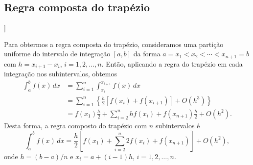 \subsection{Regra composta do trapézio}

\begin{flushleft}
  [[tag:revisar]]
\end{flushleft}

Para obtermos a regra composta do trapézio, consideramos uma partição uniforme do intervalo de integração $[a, b]$ da forma $a=x_1 < x_2 < \cdots < x_{n+1}=b$ com $h=x_{i+1}-x_{i}$, $i=1, 2, \dotsc, n$. Então, aplicando a regra do trapézio em cada integração nos subintervalos, obtemos
\begin{align}
  \int_a^bf(x)\,dx &= \sum_{i=1}^n \int_{x_i}^{x_{i+1}} f(x)\,dx\\
  &= \sum_{i=1}^n \left\{\frac{h}{2}\left[f(x_i)+f(x_{i+1})\right] + O(h^3)\right\}\\
  &= f(x_1)\frac{h}{2} + \sum_{i=2}^{n} hf(x_i) + f(x_{n+1})\frac{h}{2} + O(h^2). 
\end{align}
Desta forma, a regra composto do trapézio com $n$ subintervalos é
\begin{equation}
  \int_a^b f(x)\,dx = \frac{h}{2}\left[f(x_1) + \sum_{i=2}^{n} 2f(x_i) + f(x_{n+1})\right] + O(h^2),
\end{equation}
onde $h=(b-a)/n$ e $x_i = a + (i-1)h$, $i=1, 2, \dotsc, n$.


